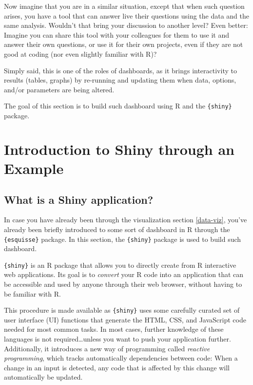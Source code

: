 \documentclass[
]{krantz}
\begin{document}
Now imagine that you are in a similar situation, except that when such question arises, you have a tool that can answer live their questions using the data and the same analysis. Wouldn't that bring your discussion to another level?
Even better: Imagine you can share this tool with your colleagues for them to use it and answer their own questions, or use it for their own projects, even if they are not good at coding (nor even slightly familiar with R)?

Simply said, this is one of the roles of dashboards, as it brings interactivity to results (tables, graphs) by re-running and updating them when data, options, and/or parameters are being altered.

The goal of this section is to build such dashboard using R and the \texttt{\{shiny\}} package.

\hypertarget{introduction-to-shiny-through-an-example}{%
\section{Introduction to Shiny through an Example}\label{introduction-to-shiny-through-an-example}}

\hypertarget{what-is-a-shiny-application}{%
\subsection{What is a Shiny application?}\label{what-is-a-shiny-application}}

In case you have already been through the visualization section \ref{data-viz}, you've already been briefly introduced to some sort of dashboard in R through the \texttt{\{esquisse\}} package. In this section, the \texttt{\{shiny\}} package is used to build such dashboard.

\texttt{\{shiny\}} is an R package that allows you to directly create from R interactive web applications. Its goal is to \emph{convert} your R code into an application that can be accessible and used by anyone through their web browser, without having to be familiar with R.

This procedure is made available as \texttt{\{shiny\}} uses some carefully curated set of user interface (UI) functions that generate the HTML, CSS, and JavaScript code needed for most common tasks. In most cases, further knowledge of these languages is not required\ldots unless you want to push your application further. Additionally, it introduces a new way of programming called \emph{reactive programming}, which tracks automatically dependencies between code: When a change in an input is detected, any code that is affected by this change will automatically be updated.
\end{document}
